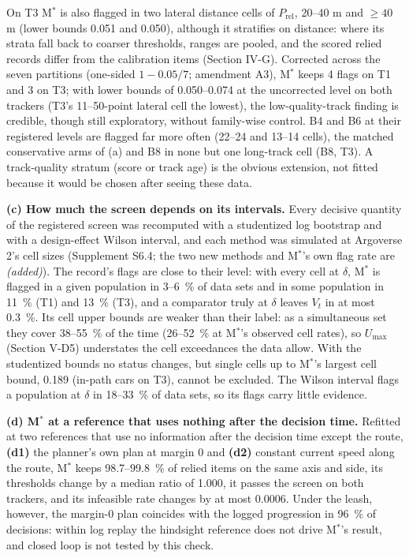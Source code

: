 \documentclass{ieeeaccess}
\begin{document}
On T3 M$^{*}$ is also flagged in two lateral distance cells of $P_{\mathrm{rel}}$, 20--40 m and $\geq 40$ m (lower bounds 0.051 and 0.050), although it stratifies on distance: where its strata fall back to coarser thresholds, ranges are pooled, and the scored relied records differ from the calibration items (Section IV-G). Corrected across the seven partitions (one-sided $1 - 0.05/7$; amendment A3), M$^{*}$ keeps 4 flags on T1 and 3 on T3; with lower bounds of 0.050--0.074 at the uncorrected level on both trackers (T3's 11--50-point lateral cell the lowest), the low-quality-track finding is credible, though still exploratory, without family-wise control. B4 and B6 at their registered levels are flagged far more often (22--24 and 13--14 cells), the matched conservative arms of (a) and B8 in none but one long-track cell (B8, T3). A track-quality stratum (score or track age) is the obvious extension, not fitted because it would be chosen after seeing these data.

\textbf{(c) How much the screen depends on its intervals.} Every decisive quantity of the registered screen was recomputed with a studentized log bootstrap and with a design-effect Wilson interval, and each method was simulated at Argoverse 2's cell sizes (Supplement S6.4; the two new methods and M$^{*}$'s own flag rate are \emph{(added)}). The record's flags are close to their level: with every cell at $\delta$, M$^{*}$ is flagged in a given population in 3--6~\% of data sets and in some population in 11~\% (T1) and 13~\% (T3), and a comparator truly at $\delta$ leaves $V_{t}$ in at most 0.3~\%. Its cell upper bounds are weaker than their label: as a simultaneous set they cover 38--55~\% of the time (26--52~\% at M$^{*}$'s observed cell rates), so $U_{\max}$ (Section V-D5) understates the cell exceedances the data allow. With the studentized bounds no status changes, but single cells up to M$^{*}$'s largest cell bound, 0.189 (in-path cars on T3), cannot be excluded. The Wilson interval flags a population at $\delta$ in 18--33~\% of data sets, so its flags carry little evidence.

\textbf{(d) M$^{*}$ at a reference that uses nothing after the decision time.} Refitted at two references that use no information after the decision time except the route, \textbf{(d1)} the planner's own plan at margin 0 and \textbf{(d2)} constant current speed along the route, M$^{*}$ keeps 98.7--99.8~\% of relied items on the same axis and side, its thresholds change by a median ratio of 1.000, it passes the screen on both trackers, and its infeasible rate changes by at most 0.0006. Under the leash, however, the margin-0 plan coincides with the logged progression in 96~\% of decisions: within log replay the hindsight reference does not drive M$^{*}$'s result, and closed loop is not tested by this check.
\end{document}
